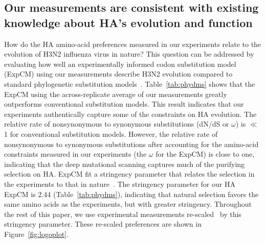 \documentclass[9pt,twocolumn,twoside]{pnas-new}
\begin{document}
\subsection*{Our measurements are consistent with existing knowledge about HA's evolution and function}
How do the HA amino-acid preferences measured in our experiments relate to the evolution of H3N2 influenza virus in nature?
This question can be addressed by evaluating how well an experimentally informed codon substitution model (ExpCM) using our measurements describe H3N2 evolution compared to standard phylogenetic substitution models~\cite{bloom2017identification,hilton2017phydms}.
Table~\ref{tab:phydms} shows that the ExpCM using the across-replicate average of our measurements greatly outperforms conventional substitution models.
This result indicates that our experiments authentically capture some of the constraints on HA evolution. 
The relative rate of nonsynonymous to synonymous substitutions (dN/dS or $\omega$) is $\ll$1 for conventional substitution models.
However, the relative rate of nonsynonymous to synonymous substitutions after accounting for the amino-acid constraints measured in our experiments (the $\omega$ for the ExpCM) is close to one, indicating that the deep mutational scanning captures much of the purifying selection on HA.
ExpCM fit a stringency parameter that relates the selection in the experiments to that in nature~\cite{bloom2017identification,hilton2017phydms}.
The stringency parameter for our HA ExpCM is 2.44 (Table~\ref{tab:phydms}), indicating that natural selection favors the same amino acids as the experiments, but with greater stringency.
Throughout the rest of this paper, we use experimental measurements re-scaled~\cite{bloom2017identification,hilton2017phydms} by this stringency parameter.
These re-scaled preferences are shown in Figure~\ref{fig:logoplot}.
\end{document}
